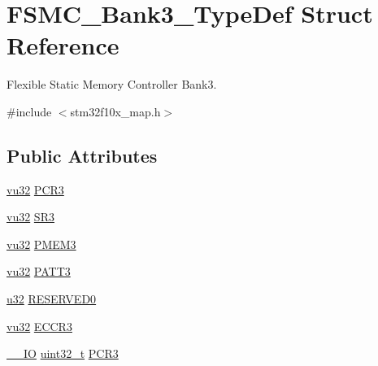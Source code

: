 \hypertarget{struct_f_s_m_c___bank3___type_def}{}\section{F\+S\+M\+C\+\_\+\+Bank3\+\_\+\+Type\+Def Struct Reference}
\label{struct_f_s_m_c___bank3___type_def}


Flexible Static Memory Controller Bank3.  




{\ttfamily \#include $<$stm32f10x\+\_\+map.\+h$>$}

\subsection*{Public Attributes}
\begin{DoxyCompactItemize}
\item 
\hyperlink{agilefox_2library_2inc_2stm32f10x__type_8h_a6e2761f0a1011f84ed96b946f2c8a563}{vu32} \hyperlink{struct_f_s_m_c___bank3___type_def_aead80d12f624d3ef42c9714fd20009ed}{P\+C\+R3}
\item 
\hyperlink{agilefox_2library_2inc_2stm32f10x__type_8h_a6e2761f0a1011f84ed96b946f2c8a563}{vu32} \hyperlink{struct_f_s_m_c___bank3___type_def_aacc20066ecea1b8bdbb6fb6959e630ed}{S\+R3}
\item 
\hyperlink{agilefox_2library_2inc_2stm32f10x__type_8h_a6e2761f0a1011f84ed96b946f2c8a563}{vu32} \hyperlink{struct_f_s_m_c___bank3___type_def_ac2c7b998daa8856261945dec8ed66f59}{P\+M\+E\+M3}
\item 
\hyperlink{agilefox_2library_2inc_2stm32f10x__type_8h_a6e2761f0a1011f84ed96b946f2c8a563}{vu32} \hyperlink{struct_f_s_m_c___bank3___type_def_a2a968a8a83b56c11e82d4ebd0f63051f}{P\+A\+T\+T3}
\item 
\hyperlink{agilefox_2library_2inc_2stm32f10x__type_8h_a2caf5cd7bcdbe1eefa727f44ffb10bac}{u32} \hyperlink{struct_f_s_m_c___bank3___type_def_a57aa5958dd875a61b08babe71cb21d6e}{R\+E\+S\+E\+R\+V\+E\+D0}
\item 
\hyperlink{agilefox_2library_2inc_2stm32f10x__type_8h_a6e2761f0a1011f84ed96b946f2c8a563}{vu32} \hyperlink{struct_f_s_m_c___bank3___type_def_afc5b0fe7006a18a0b0c546a116c6433f}{E\+C\+C\+R3}
\item 
\hyperlink{group___c_m_s_i_s___c_m3__core__definitions_gaec43007d9998a0a0e01faede4133d6be}{\+\_\+\+\_\+\+IO} \hyperlink{_p_e___types_8h_a33594304e786b158f3fb30289278f5af}{uint32\+\_\+t} \hyperlink{struct_f_s_m_c___bank3___type_def_a1f772e1028641cab7b923bf02115b919}{P\+C\+R3}

\end{DoxyCompactItemize}
